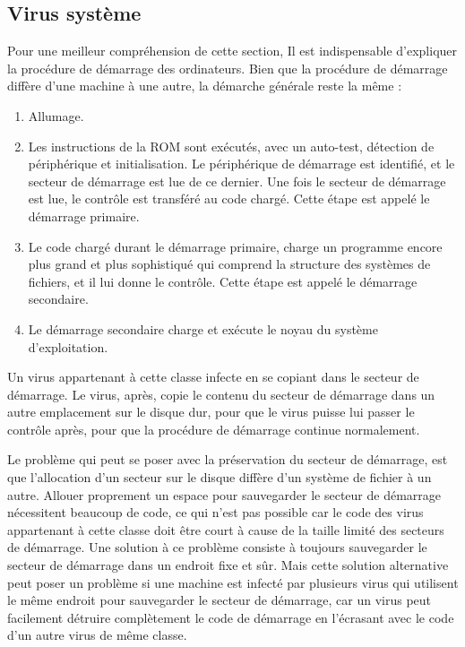     \subsection{Virus système}
    Pour une meilleur compréhension de cette section, Il est indispensable d'expliquer la procédure 
    de démarrage des ordinateurs. Bien que la procédure de démarrage diffère d'une machine à une autre, 
    la démarche générale reste la même :
    \begin{enumerate}
        \item Allumage.
        \item Les instructions de la ROM sont exécutés, avec un auto-test, détection de périphérique et 
            initialisation. Le périphérique de démarrage est identifié, et le secteur de démarrage est 
            lue de ce dernier. Une fois le secteur de démarrage est lue, le contrôle est transféré au code chargé. 
            Cette étape est appelé le démarrage primaire.
        \item Le code chargé durant le démarrage primaire, charge un programme encore plus grand et plus sophistiqué 
            qui comprend la structure des systèmes de fichiers, et il lui donne le contrôle. Cette étape est appelé
            le démarrage secondaire.
        \item Le démarrage secondaire charge et exécute le noyau du système d'exploitation.
    \end{enumerate}
    
    Un virus appartenant à cette classe infecte en se copiant dans le secteur de démarrage. Le virus, après,
    copie le contenu du secteur de démarrage dans un autre emplacement sur le disque dur, pour que le virus 
    puisse lui passer le contrôle après, pour que la procédure de démarrage continue normalement.

    Le problème qui peut se poser avec la préservation du secteur de démarrage, est que l'allocation d'un secteur 
    sur le disque diffère d'un système de fichier à un autre. Allouer proprement un espace pour sauvegarder 
    le secteur de démarrage nécessitent beaucoup de code, ce qui n'est pas possible car le code des virus
    appartenant à cette classe doit être court à cause de la taille limité des secteurs de démarrage.
    Une solution à ce problème consiste à toujours sauvegarder le secteur de démarrage dans un endroit fixe et sûr.
    Mais cette solution alternative peut poser un problème si une machine est infecté par plusieurs virus qui utilisent
    le même endroit pour sauvegarder le secteur de démarrage, car un virus peut facilement détruire complètement 
    le code de démarrage en l'écrasant avec le code d'un autre virus de même classe.

